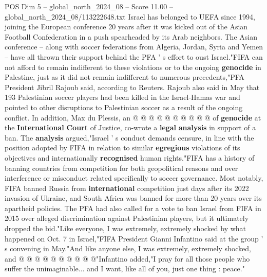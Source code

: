 \begin{textsample}{POS Dim 5 – global\_north\_2024\_08 – Score 11.00 – global\_north\_2024\_08/113222648.txt}
Israel has belonged to UEFA since 1994, joining the European conference 20 years after it was kicked out of the Asian Football Confederation in a push spearheaded by its Arab neighbors.
The Asian conference -- along with soccer federations from Algeria, Jordan, Syria and Yemen -- have all thrown their support behind the PFA ' s effort to oust Israel."FIFA can not afford to remain indifferent to these violations or to the ongoing \textbf{genocide} in Palestine, just as it did not remain indifferent to numerous precedents,"PFA President Jibril Rajoub said, according to Reuters.
Rajoub also said in May that 193 Palestinian soccer players had been killed in the Israel-Hamas war and pointed to other disruptions to Palestinian soccer as a result of the ongoing conflict.
In addition, Max du Plessis, an @ @ @ @ @ @ @ @ @ @ of \textbf{genocide} at the \textbf{International} \textbf{Court} of Justice, co-wrote a \textbf{legal} \textbf{analysis} in support of a ban.
The \textbf{analysis} argued,"Israel ' s conduct demands censure, in line with the position adopted by FIFA in relation to similar \textbf{egregious} violations of its objectives and internationally \textbf{recognised} human rights."FIFA has a history of banning countries from competition for both geopolitical reasons and over interference or misconduct related specifically to soccer governance.
Most notably, FIFA banned Russia from \textbf{international} competition just days after its 2022 invasion of Ukraine, and South Africa was banned for more than 20 years over its apartheid policies.
The PFA had also called for a vote to ban Israel from FIFA in 2015 over alleged discrimination against Palestinian players, but it ultimately dropped the bid."Like everyone, I was extremely, extremely shocked by what happened on Oct. 7 in Israel,"FIFA President Gianni Infantino said at the group ' s convening in May."And like anyone else, I was extremely, extremely shocked, and @ @ @ @ @ @ @ @ @ @"Infantino added,"I pray for all those people who suffer the unimaginable... and I want, like all of you, just one thing : peace."

\end{textsample}
